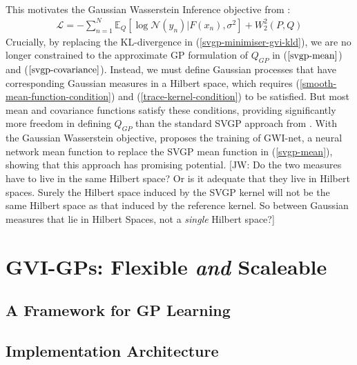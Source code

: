 \documentclass{article}
\newcommand{\jw}[1]{{\color{gray} [JW: #1]}}
\newcommand{\KLD}{\operatorname{KLD}}
\numberwithin{equation}{section}
\begin{document}
\\This motivates the Gaussian Wasserstein Inference objective from \cite{wild2022generalized}:
\begin{align}
    \label{gwi-objective}
    \mathcal{L} = -\sum_{n=1}^N \mathbb{E}_{Q}\left[\log \mathcal{N}(y_n) \vert F(x_n), \sigma^2\right] + W_2^2 (P, Q)
\end{align}
Crucially, by replacing the KL-divergence in (\ref{svgp-minimiser-gvi-kld}), we are no longer constrained to the approximate GP formulation of $Q_{GP}$ in  ($\ref{svgp-mean}$) and ($\ref{svgp-covariance}$). Instead, we must define Gaussian processes that have corresponding Gaussian measures in a Hilbert space, which requires (\ref{smooth-mean-function-condition}) and (\ref{trace-kernel-condition}) to be satisfied. But most mean and covariance functions satisfy these conditions, providing significantly more freedom in defining $Q_{GP}$ than the standard SVGP approach from \cite{titsias2009variational}. With the Gaussian Wasserstein objective, \cite{wild2022generalized} proposes the training of GWI-net, a neural network mean function to replace the SVGP mean function in (\ref{svgp-mean}), showing that this approach has promising potential.
\jw{Do the two measures have to live in the same Hilbert space? Or is it adequate that they live in Hilbert spaces. Surely the Hilbert space induced by the SVGP kernel will not be the same Hilbert space as that induced by the reference kernel. So between Gaussian measures that lie in Hilbert Spaces, not a \textit{single} Hilbert space?}


\newpage
\section{GVI-GPs: Flexible \textit{and} Scaleable}
\subsection{A Framework for GP Learning}
\subsection{Implementation Architecture}
\end{document}
